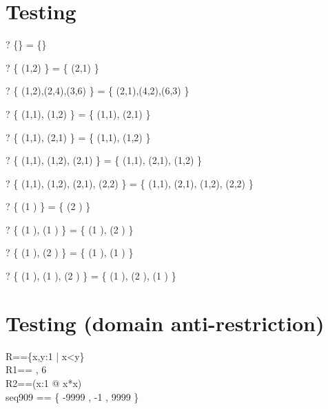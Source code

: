 \documentclass{article}
\newcommand{\negate}{-}
\begin{document}
\section{Testing \inv}
\begin{zed} \vdash? \{\} \inv = \{\} \end{zed}
\begin{zed} \vdash? \{ (1,2) \} \inv = \{ (2,1) \} \end{zed}
\begin{zed} \vdash? \{ (1,2),(2,4),(3,6) \} \inv = \{ (2,1),(4,2),(6,3) \} \end{zed}
\begin{zed} \vdash? \{ (1,1), (1,2) \} \inv = \{ (1,1), (2,1) \} \end{zed}
\begin{zed} \vdash? \{ (1,1), (2,1) \} \inv = \{ (1,1), (1,2) \} \end{zed}
\begin{zed} \vdash? \{ (1,1), (1,2), (2,1) \} \inv = \{ (1,1), (2,1), (1,2) \} \end{zed}
\begin{zed} \vdash? \{ (1,1), (1,2), (2,1), (2,2) \} \inv = \{ (1,1), (2,1), (1,2), (2,2) \} \end{zed}
\begin{zed} \vdash? \{ (1 ) \} \inv = \{ (2 ) \} \end{zed}
\begin{zed} \vdash? \{ (1 ), (1 ) \} \inv = \{ (1 ), (2 ) \} \end{zed}
\begin{zed} \vdash? \{ (1 ), (2 ) \} \inv = \{ (1 ), (1 ) \} \end{zed}
\begin{zed} \vdash? \{ (1 ), (1 ), (2 ) \} \inv = \{ (1 ), (2 ), (1 ) \} \end{zed}

\section{Testing \ndres (domain anti-restriction)}
\begin{zed}
  R==\{x,y:1  | x<y\} \\
  R1== , 6  \rangle\\
  R2==(\lambda x:1  @ x*x)\\
  seq909 == \{ \negate 9999 , \negate 1 , 9999 \mapsto \negate 9999 \}
\end{zed}
\end{document}
